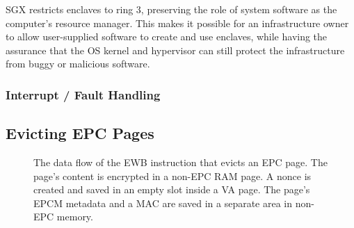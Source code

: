 SGX restricts enclaves to ring 3, preserving the role of system software as
the computer's resource manager. This makes it possible for an infrastructure
owner to allow user-supplied software to create and use enclaves, while having
the assurance that the OS kernel and hypervisor can still protect the
infrastructure from buggy or malicious software.


\subsubsection{Interrupt / Fault Handling}
\label{sec:aex}





\subsection{Evicting EPC Pages}
\label{sec:sgx_ewb}



\begin{figure}[hbt!]
  \caption{
    The data flow of the EWB instruction that evicts an EPC page. The page's
    content is encrypted in a non-EPC RAM page. A nonce is created and saved
    in an empty slot inside a VA page. The page's EPCM metadata and a MAC
    are saved in a separate area in non-EPC memory.
  }
  \label{fig:sgx_ewb}
\end{figure}


